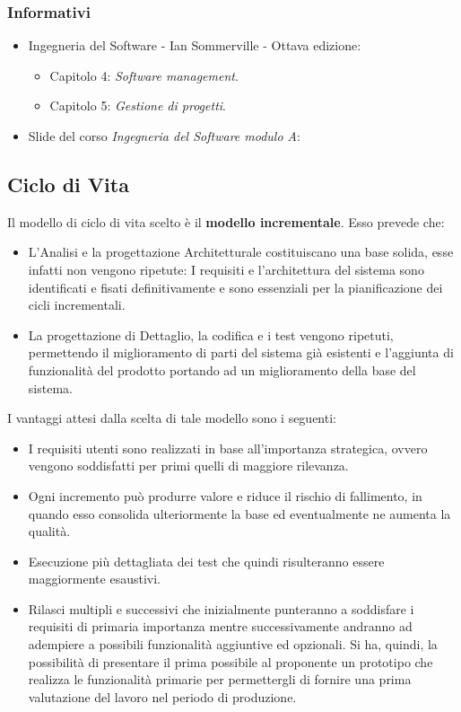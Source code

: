 \subsubsection{Informativi}
	\begin{itemize}
		\item Ingegneria del Software - Ian Sommerville - Ottava edizione:
		\begin{itemize}
			\item Capitolo 4: \textit{Software management}.
			\item Capitolo 5: \textit{Gestione di progetti}.
		\end{itemize}
		\item Slide del corso \textit{Ingegneria del Software modulo A}:
	\end{itemize}
\subsection{Ciclo di Vita}
Il modello di ciclo di vita scelto è il \textbf{modello incrementale}. Esso prevede che:
\begin{itemize}
	\item L'Analisi e la progettazione Architetturale costituiscano una base solida, esse infatti non vengono ripetute: I requisiti e l'architettura del sistema sono identificati e fisati definitivamente e sono essenziali per la pianificazione dei cicli incrementali.
	\item La progettazione di Dettaglio, la codifica e i test vengono ripetuti, permettendo il miglioramento di parti del sistema già esistenti e l'aggiunta di funzionalità del prodotto portando ad un miglioramento della base del sistema.
\end{itemize}
I vantaggi attesi dalla scelta di tale modello sono i seguenti:
\begin{itemize}
	\item I requisiti utenti sono realizzati in base all'importanza strategica, ovvero vengono soddisfatti per primi quelli di maggiore rilevanza.
	\item Ogni incremento può produrre valore e riduce il rischio di fallimento, in quando esso consolida ulteriormente la base ed eventualmente ne aumenta la qualità.
	\item Esecuzione più dettagliata dei test che quindi risulteranno essere maggiormente esaustivi.
	\item Rilasci multipli e successivi che inizialmente punteranno a soddisfare i requisiti di primaria importanza mentre successivamente andranno ad adempiere a possibili funzionalità aggiuntive ed opzionali. Si ha, quindi, la possibilità di presentare il prima possibile al proponente un prototipo che realizza le funzionalità primarie per permettergli di fornire una prima valutazione del lavoro nel periodo di produzione.
\end{itemize}
